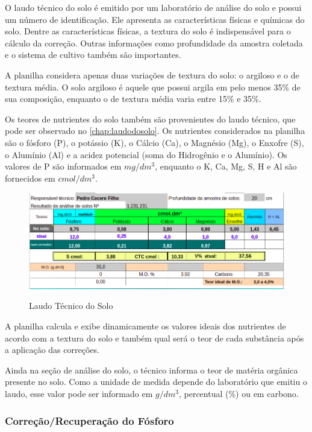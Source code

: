 O laudo técnico do solo é emitido por um laboratório de análise do solo e possui um número de identificação. Ele apresenta as características físicas e químicas do solo. Dentre as características físicas, a textura do solo é indispensável para o cálculo da correção. Outras informações como profundidade da amostra coletada e o sistema de cultivo também são importantes.

A planilha considera apenas duas variações de textura do solo: o argiloso e o de textura média. O solo argiloso é aquele que possui argila em pelo menos 35\% de sua composição, enquanto o de textura média varia entre 15\% e 35\%.

Os teores de nutrientes do solo também são provenientes do laudo técnico, que pode ser observado no \autoref{chap:laudodosolo}. Os nutrientes considerados na planilha são o fósforo (P), o potássio (K), o Cálcio (Ca), o Magnésio (Mg), o Enxofre (S), o Alumínio (Al) e a acidez potencial (soma do Hidrogênio e o Alumínio). Os valores de P são informados em \(mg/dm^3\), enquanto o K, Ca, Mg, S, H e Al são fornecidos em \(cmol/dm^3\).

\begin{figure}[H]
    \centering
    \caption{Laudo Técnico do Solo}
    \includegraphics[width=13cm]{./dados/figuras/planilha/corr_analise_quimica.png}
    \label{fig:analisequimicatabela}
\end{figure}

A planilha calcula e exibe dinamicamente os valores ideais dos nutrientes de acordo com a textura do solo e também qual será o teor de cada substância após a aplicação das correções.

Ainda na seção de análise do solo, o técnico informa o teor de matéria orgânica presente no solo. Como a unidade de medida depende do laboratório que emitiu o laudo, esse valor pode ser informado em \(g/dm^3\), percentual (\%) ou em carbono.

\subsubsection{Correção/Recuperação do Fósforo}
\label{subsubsec:corrrecfosforo}

